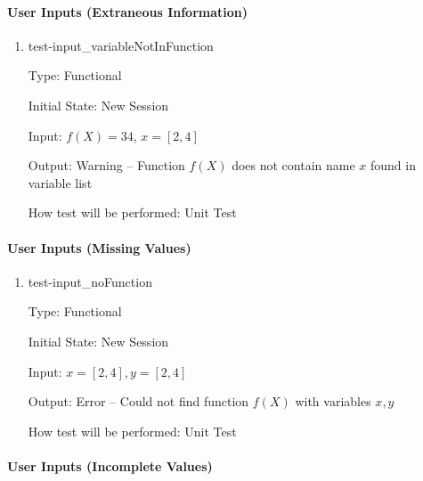 \documentclass[12pt, titlepage]{article}
\begin{document}
\paragraph{User Inputs (Extraneous Information)}
	
\begin{enumerate}
	\item{test-input\_variableNotInFunction}
	
	Type: Functional
	
	Initial State: New Session
	
	Input: $f(X) = 34$, $x = [2,4]$
	
	Output: Warning -- Function $f(X)$ does not contain name $x$ found in 
	variable list
	
	How test will be performed: Unit Test\\
	
\end{enumerate}
		
\paragraph{User Inputs (Missing Values)}

\begin{enumerate}

\item{test-input\_noFunction}

Type: Functional

Initial State: New Session

Input: $x = [2,4], y = [2,4]$

Output: Error -- Could not find function $f(X)$ with variables $x, y$

How test will be performed: Unit Test\\

\end{enumerate}

\paragraph{User Inputs (Incomplete Values)}
\end{document}
